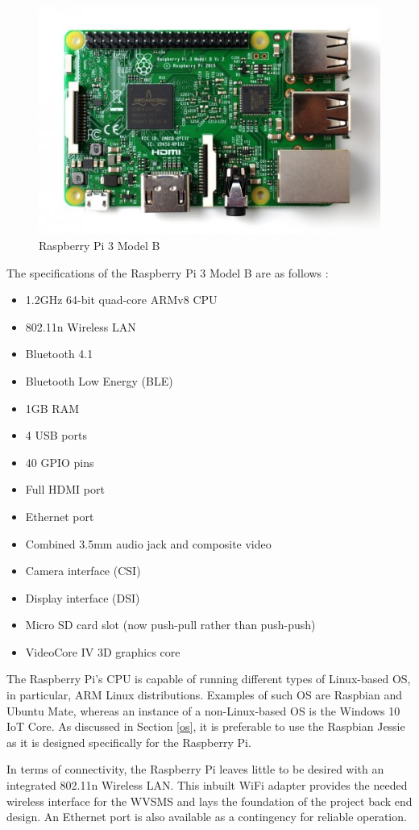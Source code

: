\begin{figure}[H]
	\centering
	\includegraphics[width=0.7\linewidth]{rpi3.jpg}
	\caption{Raspberry Pi 3 Model B \cite{rpi3pic}}
	\label{rpi3pic}
\end{figure}


\cite{rpi3mb}

The specifications of the Raspberry Pi 3 Model B are as follows \cite{rpi3mb}: 
\begin{itemize}
	\item 1.2GHz 64-bit quad-core ARMv8 CPU
	\item 802.11n Wireless LAN
	\item Bluetooth 4.1
	\item Bluetooth Low Energy (BLE)
	\item 1GB RAM
	\item 4 USB ports
	\item 40 GPIO pins
	\item Full HDMI port
	\item Ethernet port
	\item Combined 3.5mm audio jack and composite video
	\item Camera interface (CSI)
	\item Display interface (DSI)
	\item Micro SD card slot (now push-pull rather than push-push)
	\item VideoCore IV 3D graphics core
\end{itemize}

The Raspberry Pi's CPU is capable of running different types of Linux-based OS, in particular, ARM Linux distributions. Examples of such OS are Raspbian and Ubuntu Mate, whereas an instance of a non-Linux-based OS is the Windows 10 IoT Core. As discussed in Section \ref{os}, it is preferable to use the Raspbian Jessie as it is designed specifically for the Raspberry Pi. 

In terms of connectivity, the Raspberry Pi leaves little to be desired with an integrated 802.11n Wireless LAN. This inbuilt WiFi adapter provides the needed wireless interface for the WVSMS and lays the foundation of the project back end design. An Ethernet port is also available as a contingency for reliable operation. 

